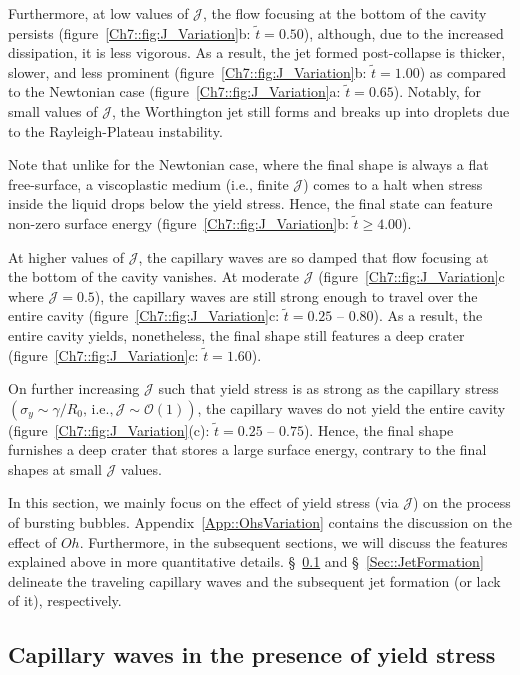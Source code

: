 Furthermore, at low values of $\mathcal{J}$, the flow focusing at the bottom of the cavity persists (figure~\ref{Ch7::fig:J_Variation}b: $\tilde t = 0.50$), although, due to the increased dissipation, it is less vigorous. As a result, the jet formed post-collapse is thicker, slower, and less prominent (figure~\ref{Ch7::fig:J_Variation}b: $\tilde t = 1.00$) as compared to the Newtonian case (figure~\ref{Ch7::fig:J_Variation}a: $\tilde t = 0.65$). Notably, for small values of $\mathcal{J}$, the Worthington jet still forms and breaks up into droplets due to the Rayleigh-Plateau instability. 

Note that unlike for the Newtonian case, where the final shape is always a flat free-surface, a viscoplastic medium (i.e., finite $\mathcal{J}$) comes to a halt when stress inside the liquid drops below the yield stress. Hence, the final state can feature non-zero surface energy (figure~\ref{Ch7::fig:J_Variation}b: $\tilde t \ge 4.00$). 

At higher values of $\mathcal{J}$, the capillary waves are so damped that flow focusing at the bottom of the cavity vanishes. At moderate $\mathcal{J}$ (figure~\ref{Ch7::fig:J_Variation}c where $\mathcal{J} = 0.5$), the capillary waves are still strong enough to travel over the entire cavity (figure~\ref{Ch7::fig:J_Variation}c: $\tilde t = 0.25$ -- $0.80$). As a result, the entire cavity yields, nonetheless,  the final shape still features a deep crater (figure~\ref{Ch7::fig:J_Variation}c: $\tilde t = 1.60$). 

On further increasing $\mathcal{J}$ such that yield stress is as strong as the capillary stress $\left(\sigma_y \sim \gamma/R_0\text{, i.e.,}\,\mathcal{J} \sim \mathcal{O}\left(1\right)\right)$, the capillary waves do not yield the entire cavity (figure~\ref{Ch7::fig:J_Variation}(c): $\tilde t = 0.25$ -- $0.75$). Hence, the final shape furnishes a deep crater that stores a large surface energy, contrary to the final shapes at small $\mathcal{J}$  values.

In this section, we mainly focus on the effect of yield stress (via $\mathcal{J}$) on the process of bursting bubbles. Appendix~\ref{App::OhsVariation} contains the discussion on the effect of $Oh$. Furthermore, in the subsequent sections, we will discuss the features explained above in more quantitative details. \S~\ref{Sec::CapillaryWaves} and \S~\ref{Sec::JetFormation} delineate the traveling capillary waves and the subsequent jet formation (or lack of it), respectively.  

\subsection{Capillary waves in the presence of yield stress}\label{Sec::CapillaryWaves}

